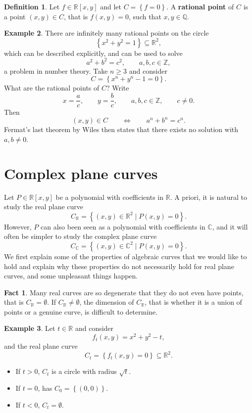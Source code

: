 \documentclass{article}
\newcommand{\Z}{\mathbb{Z}}
\newcommand{\Q}{\mathbb{Q}}
\newcommand{\R}{\mathbb{R}}
\newcommand{\C}{\mathbb{C}}
\newcommand{\rb}[1]{\left( #1 \right)}
\renewcommand{\sb}[1]{\left[ #1 \right]}
\newcommand{\cb}[1]{\left\{ #1 \right\}}
\theoremstyle{definition}\newtheorem{definition}{Definition}[section]
\theoremstyle{definition}\newtheorem{notation}[definition]{Notation}
\theoremstyle{definition}\newtheorem{remark}[definition]{Remark}
\theoremstyle{definition}\newtheorem{example1}[definition]{Example}
\theoremstyle{definition}\newtheorem{fact}{Fact}
\theoremstyle{definition}\newtheorem{exercise}{Exercise}
\theoremstyle{definition}\newtheorem*{example2}{Example}
\begin{document}

\begin{definition}
Let $ f \in \R\sb{x, y} $ and let $ C = \cb{f = 0} $. A \textbf{rational point} of $ C $ is a point $ \rb{x, y} \in C $, that is $ f\rb{x, y} = 0 $, such that $ x, y \in \Q $.
\end{definition}

\begin{example1}
There are infinitely many rational points on the circle
$$ \cb{x^2 + y^2 = 1} \subseteq \R^2, $$
which can be described explicitly, and can be used to solve
$$ a^2 + b^2 = c^2, \qquad a, b, c \in \Z, $$
a problem in number theory. Take $ n \ge 3 $ and consider
$$ C = \cb{x^n + y^n - 1 = 0}. $$
What are the rational points of $ C $? Write
$$ x = \dfrac{a}{c}, \qquad y = \dfrac{b}{c}, \qquad a, b, c \in \Z, \qquad c \ne 0. $$
Then
$$ \rb{x, y} \in C \qquad \iff \qquad a^n + b^n = c^n. $$
Fermat's last theorem by Wiles then states that there exists no solution with $ a, b \ne 0 $.
\end{example1}

\pagebreak

\section{Complex plane curves}

Let $ P \in \R\sb{x, y} $ be a polynomial with coefficients in $ \R $. A priori, it is natural to study the real plane curve
$$ C_\R = \cb{\rb{x, y} \in \R^2 \mid P\rb{x, y} = 0}. $$
However, $ P $ can also been seen as a polynomial with coefficients in $ \C $, and it will often be simpler to study the complex plane curve
$$ C_\C = \cb{\rb{x, y} \in \C^2 \mid P\rb{x, y} = 0}. $$
We first explain some of the properties of algebraic curves that we would like to hold and explain why these properties do not necessarily hold for real plane curves, and some unpleasant things happen.

\begin{fact}
Many real curves are so degenerate that they do not even have points, that is $ C_\R = \emptyset $. If $ C_\R \ne \emptyset $, the dimension of $ C_\R $, that is whether it is a union of points or a genuine curve, is difficult to determine.
\end{fact}

\begin{example1}
\label{eg:2.1}
Let $ t \in \R $ and consider
$$ f_t\rb{x, y} = x^2 + y^2 - t, $$
and the real plane curve
$$ C_t = \cb{f_t\rb{x, y} = 0} \subseteq \R^2. $$
\begin{itemize}
\item If $ t > 0 $, $ C_t $ is a circle with radius $ \sqrt{t} $.
\item If $ t = 0 $, has $ C_0 = \cb{\rb{0, 0}} $.
\item If $ t < 0 $, $ C_t = \emptyset $.
\end{itemize}

\end{example1}
\end{document}

